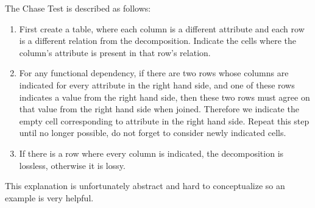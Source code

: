 \documentclass{report}
\begin{document}
\vspace{.5cm}
 
The Chase Test is described as follows:
\begin{enumerate}
    \item First create a table, where each column is a different attribute and each row is a different relation from the decomposition. Indicate the cells where the column's attribute is present in that row's relation.
    \item For any functional dependency, if there are two rows whose columns are indicated for every attribute in the right hand side, and one of these rows indicates a value from the right hand side, then these two rows must agree on that value from the right hand side when joined. Therefore we indicate the empty cell corresponding to attribute in the right hand side. Repeat this step until no longer possible, do not forget to consider newly indicated cells.
    \item If there is a row where every column is indicated, the decomposition is lossless, otherwise it is lossy.
\end{enumerate}
This explanation is unfortunately abstract and hard to conceptualize so an example is very helpful.
\end{document}
